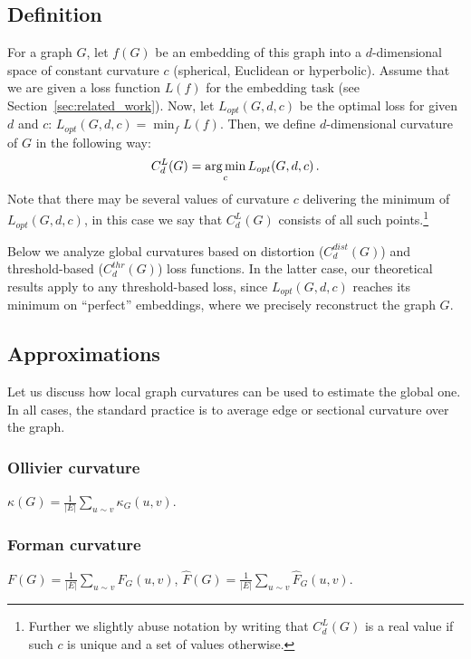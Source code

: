 \documentclass[runningheads]{llncs}
\begin{document}
\subsection{Definition}\label{sec:global_curvature_definition}

For a graph $G$, let $f(G)$ be an embedding of this graph into a $d$-dimensional space of constant curvature $c$ (spherical, Euclidean or hyperbolic).
Assume that we are given a loss function $L(f)$ for the embedding task (see Section~\ref{sec:related_work}).
Now, let $L_{opt}(G,d,c)$ be the optimal loss for given $d$ and $c$:
$L_{opt}(G,d,c) = \min_{f} L(f).$
Then, we define $d$-dimensional curvature of $G$ in the following way:
\begin{equation}\label{eq:global_curvature}
C_{d}^{L}(G) = \operatorname*{arg\,min}_c L_{opt}(G,d,c)\,.
\end{equation}
Note that there may be several values of curvature $c$ delivering the minimum of $L_{opt}(G,d,c)$, in this case we say that  $C_{d}^{L}(G)$ consists of all such points.\footnote{Further we slightly abuse notation by writing that $C_{d}^{L}(G)$ is a real value if such $c$ is unique and a set of values otherwise.}

Below we analyze global curvatures based on distortion ($C_d^{dist}(G)$) and threshold-based ($C_d^{thr}(G)$) loss functions. 
In the latter case, our theoretical results apply to any threshold-based loss, since 
$L_{opt}(G,d,c)$ reaches its minimum on ``perfect'' embeddings, where we precisely reconstruct the graph $G$.

\subsection{Approximations}

Let us discuss how local graph curvatures can be used to estimate the global one. In all cases, the standard practice is to average edge or sectional curvature over the graph.

\subsubsection{Ollivier curvature} $\kappa(G) = \frac{1}{|E|}\sum\limits_{u\sim v} \kappa_G(u,v)$.

\subsubsection{Forman curvature} $F(G) = \frac{1}{|E|}\sum\limits_{u\sim v} F_G(u,v)$, $\hat F(G) = \frac{1}{|E|}\sum\limits_{u\sim v} \hat F_G(u,v)$.
\end{document}
